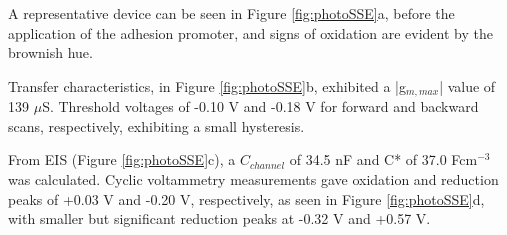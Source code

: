 
A representative device can be seen in Figure \ref{fig:photoSSE}a, before the application of the adhesion promoter, and signs of oxidation are evident by the brownish hue. 

Transfer characteristics, in Figure \ref{fig:photoSSE}b, exhibited a |g$_{m,max}$| value of 139 $\mu$S. Threshold voltages of -0.10 V and -0.18 V for forward and backward scans, respectively, exhibiting a small hysteresis. 

From EIS (Figure \ref{fig:photoSSE}c), a $C_{channel}$ of 34.5 nF and C* of 37.0 Fcm$^{-3}$ was calculated. Cyclic voltammetry measurements gave oxidation and reduction peaks of +0.03 V and -0.20 V, respectively, as seen in Figure \ref{fig:photoSSE}d, with smaller but significant reduction peaks at -0.32 V and +0.57 V.

